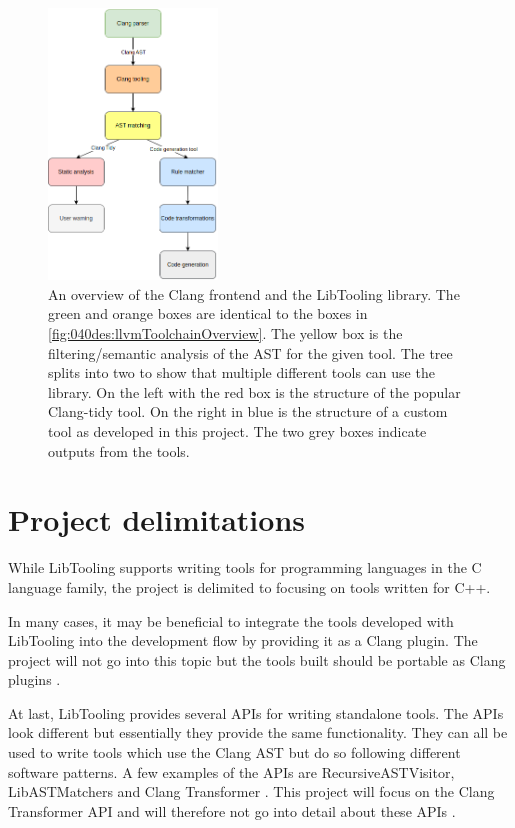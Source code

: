 \begin{figure}[H]
    \centering
    \includegraphics[width=0.4\textwidth]{figs/040des/clang_tool_pipeline.png}
    \caption{An overview of the Clang frontend and the LibTooling library. The green and orange boxes are identical to the boxes in \cref{fig:040des:llvmToolchainOverview}. The yellow box is the filtering/semantic analysis of the AST for the given tool. The tree splits into two to show that multiple different tools can use the library. On the left with the red box is the structure of the popular Clang-tidy tool\cite{ClangTidyExtraClang}. On the right in blue is the structure of a custom tool as developed in this project. The two grey boxes indicate outputs from the tools.}
    \label{fig:040des:clangToolingOverview}
\end{figure}


\section{Project delimitations}
While LibTooling supports writing tools for programming languages in the C language family, the project is delimited to focusing on tools written for C++.

In many cases, it may be beneficial to integrate the tools developed with LibTooling into the development flow by providing it as a Clang plugin. The project will not go into this topic but the tools built should be portable as Clang plugins \cite{ClangPluginsClang}.

At last, LibTooling provides several APIs for writing standalone tools. The APIs look different but essentially they provide the same functionality. They can all be used to write tools which use the Clang AST but do so following different software patterns. A few examples of the APIs are RecursiveASTVisitor, LibASTMatchers and Clang Transformer \cite{HowWriteRecursiveASTVisitor,llvmWelcomeClangDocumentation}. This project will focus on the Clang Transformer API and will therefore not go into detail about these APIs \cite{ClangTransformerTutoriala}.